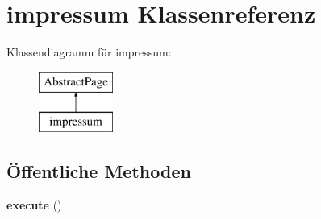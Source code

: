 \hypertarget{classimpressum}{}\section{impressum Klassenreferenz}
\label{classimpressum}
Klassendiagramm für impressum\+:\begin{figure}[H]
\begin{center}
\leavevmode
\includegraphics[height=2.000000cm]{classimpressum}
\end{center}
\end{figure}
\subsection*{Öffentliche Methoden}
\begin{DoxyCompactItemize}
\item 
\mbox{\label{classimpressum_a9ae6642033a91720798b139f5af2eb52}} 
{\bfseries execute} ()
\end{DoxyCompactItemize}
